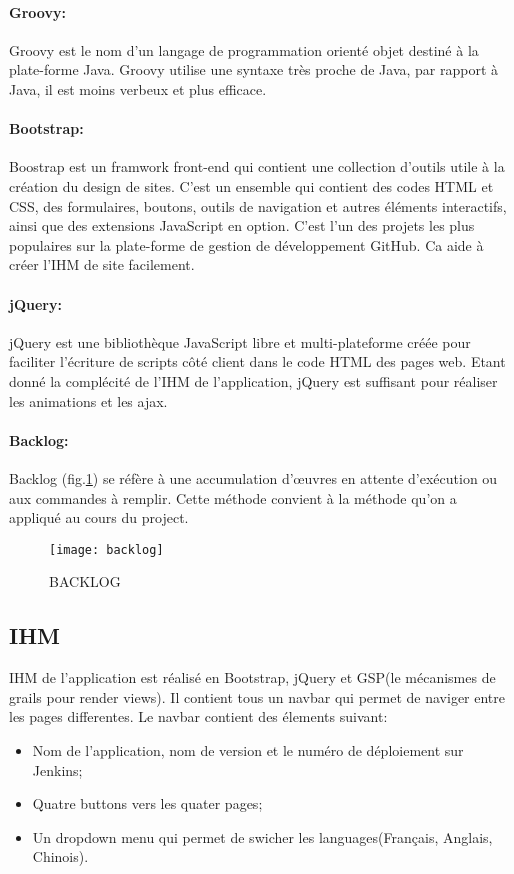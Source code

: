 \paragraph{Groovy:}
Groovy est le nom d'un langage de programmation orienté objet destiné à la plate-forme Java.
Groovy utilise une syntaxe très proche de Java, par rapport à Java, il est moins verbeux et plus efficace.
\paragraph{Bootstrap:}
Boostrap est un framwork front-end qui contient  une collection d'outils utile à la création du design de sites. C'est un ensemble qui contient des codes HTML et CSS, des formulaires, boutons, outils de navigation et autres éléments interactifs, ainsi que des extensions JavaScript en option. C'est l'un des projets les plus populaires sur la plate-forme de gestion de développement GitHub.
Ca aide à créer l'IHM de site facilement.
\paragraph{jQuery:}
jQuery est une bibliothèque JavaScript libre et multi-plateforme créée pour faciliter l'écriture de scripts côté client dans le code HTML des pages web.
Etant donné la complécité de l'IHM de l'application, jQuery est suffisant pour réaliser les animations et les ajax.
\paragraph{Backlog:}
Backlog (fig.\ref{fig:backlog}) se réfère à une accumulation d'œuvres en attente d'exécution ou aux commandes à remplir.
Cette méthode convient à la méthode qu'on a appliqué au cours du project.

\begin{figure}[ht]
 \centering
 \texttt{[image: backlog]}
 \caption{BACKLOG}
 \label{fig:backlog}
\end{figure}

\subsection{IHM}
IHM de l'application est réalisé en Bootstrap, jQuery et GSP(le mécanismes de grails pour render views).
Il contient tous un navbar qui permet de naviger entre les pages differentes.
Le navbar contient des élements suivant:
\begin{itemize}
 \item Nom de l'application, nom de version et le numéro de déploiement sur Jenkins;
 \item Quatre buttons vers les quater pages;
 \item Un dropdown menu qui permet de swicher les languages(Français, Anglais, Chinois).
\end{itemize}

